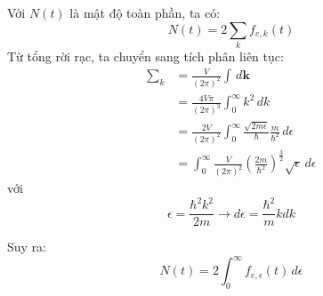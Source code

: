 \documentclass[14Pt]{article}
\begin{document}
	Với $N(t)$ là mật độ toàn phần, ta có:
	\begin{equation}
		N(t) = 2 \sum_k f_{e,k} (t)
	\end{equation}
	Từ tổng rời rạc, ta chuyển sang tích phân liên tục:
	\begin{align*}
		\sum_k &= \frac{V}{(2\pi)^2} \int \, d\mathbf{k} \\
		&= \frac{4V\pi}{(2\pi)^3} \int_{0}^{\infty} k^2\, dk \\
		&= \frac{2V}{(2\pi)^2} \int_{0}^{\infty} \frac{\sqrt{2m\epsilon}}{\hbar} \frac{m}{\hbar^2} \, d\epsilon  \\
		&= \int_{0}^{\infty} \frac{V}{(2\pi)^2}	(\frac{2m}{\hbar^2})^\frac{3}{2} \sqrt{\epsilon} \, d\epsilon 
	\end{align*}
	với 
	\[
	\epsilon = \frac{\hbar^2 k^2}{2m} \rightarrow d\epsilon = \frac{\hbar^2}{m} kdk
	\]
	
	Suy ra:
	\begin{equation*}
		N(t) = 2 \int_{0}^{\infty} f_{e,\epsilon} (t) \, d\epsilon
	\end{equation*}
	
\end{document}

